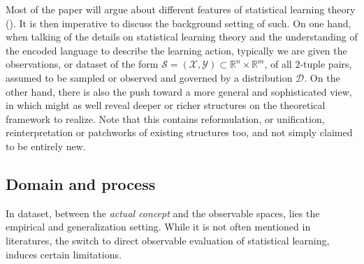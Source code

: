 Most of the paper will argue about different features of statistical learning theory (\cite{Sterkenburg_2024,Vapnik1999-VAPTNO,STL_Hajek_Maxim_2021}). It is then imperative to discuss the background setting of such. On one hand, when talking of the details on statistical learning theory and the understanding of the encoded language to describe the learning action, typically we are given the observations, or dataset of the form $\mathcal{S}=(\mathcal{X},\mathcal{Y})\subset \mathbb{R}^{n}\times \mathbb{R}^{m}$, of all 2-tuple pairs, assumed to be sampled or observed and governed by a distribution $\mathcal{D}$. On the other hand, there is also the push toward a more general and sophisticated view, in which might as well reveal deeper or richer structures on the theoretical framework to realize. Note that this contains reformulation, or unification, reinterpretation or patchworks of existing structures too, and not simply claimed to be entirely new. 

\subsection{Domain and process}

In dataset, between the \textit{actual concept} and the observable spaces, lies the empirical and generalization setting. While it is not often mentioned in literatures, the switch to direct observable evaluation of statistical learning, induces certain limitations. 


